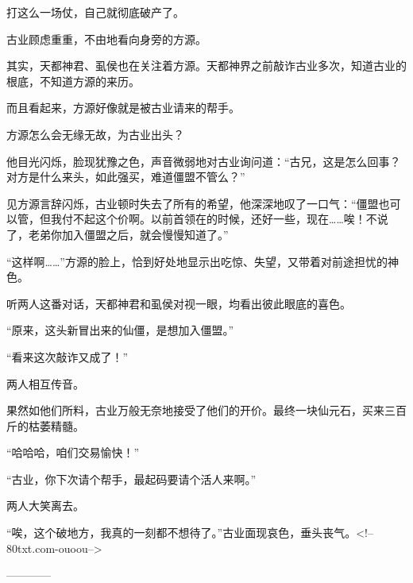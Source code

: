 \begin{this_body}
打这么一场仗，自己就彻底破产了。

古业顾虑重重，不由地看向身旁的方源。

其实，天都神君、虱侯也在关注着方源。天都神界之前敲诈古业多次，知道古业的根底，不知道方源的来历。

而且看起来，方源好像就是被古业请来的帮手。

方源怎么会无缘无故，为古业出头？

他目光闪烁，脸现犹豫之色，声音微弱地对古业询问道：“古兄，这是怎么回事？对方是什么来头，如此强买，难道僵盟不管么？”

见方源言辞闪烁，古业顿时失去了所有的希望，他深深地叹了一口气：“僵盟也可以管，但我付不起这个价啊。以前首领在的时候，还好一些，现在……唉！不说了，老弟你加入僵盟之后，就会慢慢知道了。”

“这样啊……”方源的脸上，恰到好处地显示出吃惊、失望，又带着对前途担忧的神色。

听两人这番对话，天都神君和虱侯对视一眼，均看出彼此眼底的喜色。

“原来，这头新冒出来的仙僵，是想加入僵盟。”

“看来这次敲诈又成了！”

两人相互传音。

果然如他们所料，古业万般无奈地接受了他们的开价。最终一块仙元石，买来三百斤的枯萎精髓。

“哈哈哈，咱们交易愉快！”

“古业，你下次请个帮手，最起码要请个活人来啊。”

两人大笑离去。

“唉，这个破地方，我真的一刻都不想待了。”古业面现哀色，垂头丧气。<!--80txt.com-ouoou-->

------------

\end{this_body}

